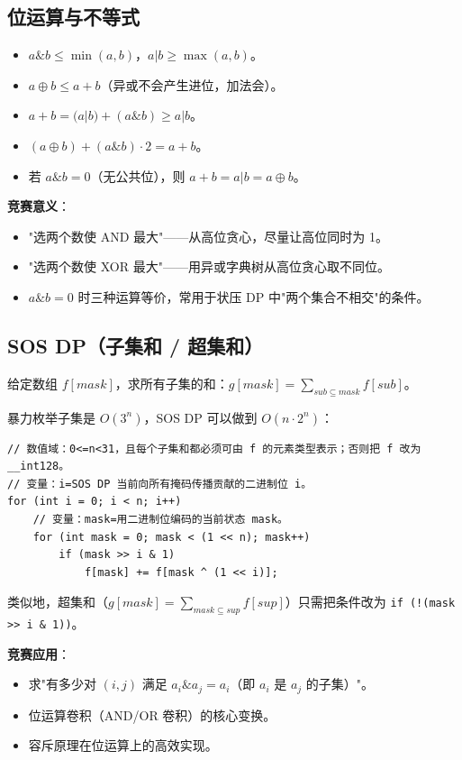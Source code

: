 \documentclass[UTF8,openany,oneside,zihao=-4]{ctexbook}
\begin{document}
\subsection{位运算与不等式}

\begin{note}
\begin{itemize}
  \item $a \& b \le \min(a, b)$，$a | b \ge \max(a, b)$。
  \item $a \oplus b \le a + b$（异或不会产生进位，加法会）。
  \item $a + b = (a | b) + (a \& b) \ge a | b$。
  \item $(a \oplus b) + (a \& b) \cdot 2 = a + b$。
  \item 若 $a \& b = 0$（无公共位），则 $a + b = a | b = a \oplus b$。
\end{itemize}

\textbf{竞赛意义}：
\begin{itemize}
  \item "选两个数使 AND 最大"——从高位贪心，尽量让高位同时为 1。
  \item "选两个数使 XOR 最大"——用异或字典树从高位贪心取不同位。
  \item $a \& b = 0$ 时三种运算等价，常用于状压 DP 中"两个集合不相交"的条件。
\end{itemize}
\end{note}

\subsection{SOS DP（子集和 / 超集和）}

\begin{note}
给定数组 $f[mask]$，求所有子集的和：$g[mask] = \sum_{sub \subseteq mask} f[sub]$。

暴力枚举子集是 $O(3^n)$，SOS DP 可以做到 $O(n \cdot 2^n)$：
\begin{lstlisting}
// 数值域：0<=n<31，且每个子集和都必须可由 f 的元素类型表示；否则把 f 改为 __int128。
// 变量：i=SOS DP 当前向所有掩码传播贡献的二进制位 i。
for (int i = 0; i < n; i++)
    // 变量：mask=用二进制位编码的当前状态 mask。
    for (int mask = 0; mask < (1 << n); mask++)
        if (mask >> i & 1)
            f[mask] += f[mask ^ (1 << i)];
\end{lstlisting}

类似地，超集和（$g[mask] = \sum_{mask \subseteq sup} f[sup]$）只需把条件改为 \lstinline|if (!(mask >> i & 1))|。

\textbf{竞赛应用}：
\begin{itemize}
  \item 求"有多少对 $(i,j)$ 满足 $a_i \& a_j = a_i$（即 $a_i$ 是 $a_j$ 的子集）"。
  \item 位运算卷积（AND/OR 卷积）的核心变换。
  \item 容斥原理在位运算上的高效实现。
\end{itemize}
\end{note}
\end{document}
